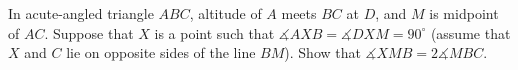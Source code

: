 In acute-angled triangle $ABC$,  altitude of $A$ meets $BC$ at $D$,  and $M$ is midpoint of $AC$. Suppose that $X$ is a point such that $\measuredangle AXB = \measuredangle DXM =90^\circ$ (assume that $X$ and $C$ lie on opposite sides of the line $BM$). Show that $\measuredangle XMB = 2\measuredangle MBC$.